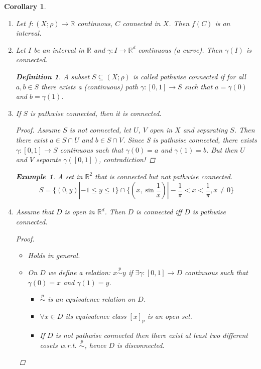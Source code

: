 \documentclass[12pt]{amsbook}
\newtheorem{corollary}[theorem]{Corollary}
\theoremstyle{definition}
\newtheorem{definition}[theorem]{Definition}
\newtheorem{example}[theorem]{Example}
\newcommand{\RR}{{\mathbb R}}
\newcommand{\Ra}{\Rightarrow} %
\newcommand{\La}{\Leftarrow} %
\newcommand{\ra}{\rightarrow} %
\begin{document}
\begin{corollary} %
\begin{enumerate}
\item Let $f: (X; \rho) \ra \RR$ continuous, $C$ connected in $X$. Then $f(C)$ is an interval.
\item Let $I$ be an interval in $\RR$ and $\gamma: I \ra \RR^d$ continuous (a curve). Then $\gamma(I)$ is connected.

\begin{definition}
A subset $S \subseteq (X; \rho)$ is called \emph{pathwise connected} if for all $a, b \in S$ there exists a (continuous) path $\gamma: [0,1] \ra S$ such that $a = \gamma(0)$ and $b = \gamma(1)$.
\end{definition}

\item If $S$ is pathwise connected, then it is connected.

\begin{proof}
Assume $S$ is not connected, let $U$, $V$ open in $X$ and separating $S$. Then there exist $a \in S \cap U$ and $b \in S \cap V$.
Since S is pathwise connected, there exists $\gamma: [0,1] \ra S$ continuous such that $\gamma(0) = a$ and $\gamma(1) = b$. But then $U$ and $V$ separate $\gamma([0,1])$, contradiction!
\end{proof}

\begin{example}
A set in $\RR^2$ that is connected but not pathwise connected.
\begin{equation*}
S = \{(0,y) | -1 \leq y \leq 1 \} \cap \{ (x, \sin \frac{1}{x}) | -\frac{1}{\pi} < x < \frac{1}{\pi}, x \neq 0 \} %
\end{equation*}
\end{example}

\item Assume that $D$ is open in $\RR^d$. Then $D$ is connected iff $D$ is pathwise connected.

\begin{proof} \
\begin{itemize}
\item["$\La$"] Holds in general.
\item["$\Ra$"] On $D$ we define a relation: $x \overset{p}\sim y$ if $\exists \gamma: [0,1] \ra D$ continuous such that $\gamma(0) = x$ and $\gamma(1) = y$.
\begin{itemize}
\item[$\bullet$] $\stackrel{p}\sim$ is an equivalence relation on $D$.
\item[$\bullet$] $\forall x \in D$ its equivalence class $[x]_p$ is an open set.
\item[$\bullet$] If $D$ is not pathwise connected then there exist at least two different cosets w.r.t. $\overset{p}\sim$, hence $D$ is disconnected.
\end{itemize}
\end{itemize}
\end{proof}
\end{enumerate}
\end{corollary}
\end{document}
